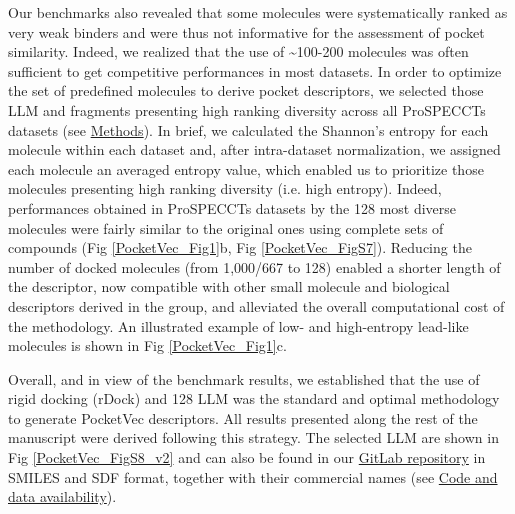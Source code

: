 Our benchmarks also revealed that some molecules were systematically ranked as very weak binders and were thus not informative for the assessment of pocket similarity. Indeed, we realized that the use of \textasciitilde100-200 molecules was often sufficient to get competitive performances in most datasets. In order to optimize the set of predefined molecules to derive pocket descriptors, we selected those LLM and fragments presenting high ranking diversity across all ProSPECCTs datasets (see \hyperref[PocketVec_Methods]{Methods}). In brief, we calculated the Shannon’s entropy for each molecule within each dataset and, after intra-dataset normalization, we assigned each molecule an averaged entropy value, which enabled us to prioritize those molecules presenting high ranking diversity (i.e. high entropy). Indeed, performances obtained in ProSPECCTs datasets by the 128 most diverse molecules were fairly similar to the original ones using complete sets of compounds (Fig \ref{PocketVec_Fig1}b, Fig \ref{PocketVec_FigS7}). Reducing the number of docked molecules (from 1,000/667 to 128) enabled a shorter length of the descriptor, now compatible with other small molecule and biological descriptors derived in the group\cite{fernandez-torras_integrating_2022, duran-frigola_extending_2020, bertoni_bioactivity_2021}, and alleviated the overall computational cost of the methodology. An illustrated example of low- and high-entropy lead-like molecules is shown in Fig \ref{PocketVec_Fig1}c.

Overall, and in view of the benchmark results, we established that the use of rigid docking (rDock) and 128 LLM was the standard and optimal methodology to generate PocketVec descriptors. All results presented along the rest of the manuscript were derived following this strategy. The selected LLM are shown in Fig \ref{PocketVec_FigS8_v2} and can also be found in our \href{https://gitlabsbnb.irbbarcelona.org/acomajuncosa/pocketvec}{GitLab repository} in SMILES and SDF format, together with their commercial names (see \hyperref[PocketVec_Code]{Code and data availability}). 


